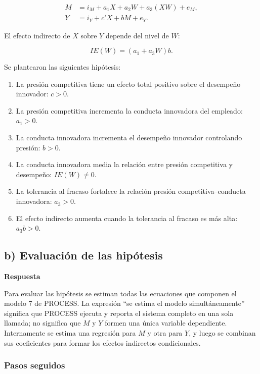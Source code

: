 \documentclass[11pt,letterpaper]{article}
\begin{document}
\begin{align}
M &= i_M+a_1X+a_2W+a_3(XW)+e_M,\\
Y &= i_Y+c'X+bM+e_Y.
\end{align}

El efecto indirecto de $X$ sobre $Y$ depende del nivel de $W$:

\begin{equation}
IE(W)=(a_1+a_3W)b.
\end{equation}

Se plantearon las siguientes hipótesis:

\begin{enumerate}[label=H\arabic*.,leftmargin=1.2cm]
\item La presión competitiva tiene un efecto total positivo sobre el desempeño innovador: $c>0$.
\item La presión competitiva incrementa la conducta innovadora del empleado: $a_1>0$.
\item La conducta innovadora incrementa el desempeño innovador controlando presión: $b>0$.
\item La conducta innovadora media la relación entre presión competitiva y desempeño: $IE(W)\neq0$.
\item La tolerancia al fracaso fortalece la relación presión competitiva--conducta innovadora: $a_3>0$.
\item El efecto indirecto aumenta cuando la tolerancia al fracaso es más alta: $a_3b>0$.
\end{enumerate}

\subsection{b) Evaluación de las hipótesis}

\textbf{Respuesta}

Para evaluar las hipótesis se estiman todas las ecuaciones que componen el modelo 7 de PROCESS. La expresión ``se estima el modelo simultáneamente'' significa que PROCESS ejecuta y reporta el sistema completo en una sola llamada; no significa que $M$ y $Y$ formen una única variable dependiente. Internamente se estima una regresión para $M$ y otra para $Y$, y luego se combinan sus coeficientes para formar los efectos indirectos condicionales.

\subsubsection*{Pasos seguidos}
\end{document}
